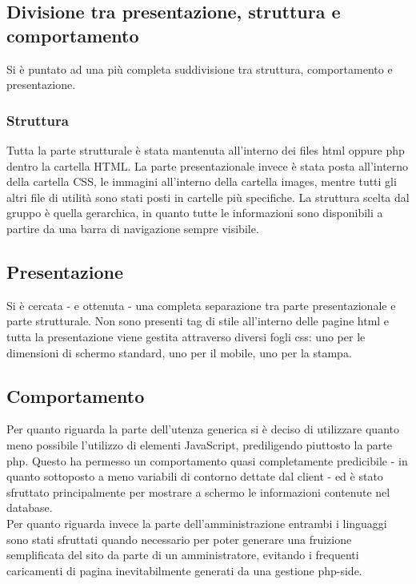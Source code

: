 \subsection{Divisione tra presentazione, struttura e comportamento}
Si è puntato ad una più completa suddivisione tra struttura, comportamento e presentazione.
\subsubsection{Struttura}
Tutta la parte strutturale è stata mantenuta all'interno dei files html oppure php dentro la cartella HTML. La parte presentazionale invece è stata posta all'interno della cartella CSS, le immagini all'interno della cartella images, mentre tutti gli altri file di utilità sono stati posti in cartelle più specifiche. La struttura scelta dal gruppo è quella gerarchica, in quanto tutte le informazioni sono disponibili a partire da una barra di navigazione sempre visibile.
\subsection{Presentazione}
Si è cercata - e ottenuta - una completa separazione tra parte presentazionale e parte strutturale. Non sono presenti tag di stile all'interno delle pagine html e tutta la presentazione viene gestita attraverso diversi fogli css: uno per le dimensioni di schermo standard, uno per il mobile, uno per la stampa.
\subsection{Comportamento}
Per quanto riguarda la parte dell'utenza generica si è deciso di utilizzare quanto meno possibile l'utilizzo di elementi JavaScript, prediligendo piuttosto la parte php. Questo ha permesso un comportamento quasi completamente predicibile - in quanto sottoposto a meno variabili di contorno dettate dal client - ed è stato sfruttato principalmente per mostrare a schermo le informazioni contenute nel database.
\\Per quanto riguarda invece la parte dell'amministrazione entrambi i linguaggi sono stati sfruttati quando necessario per poter generare una fruizione semplificata del sito da parte di un amministratore, evitando i frequenti caricamenti di pagina inevitabilmente generati da una gestione php-side.